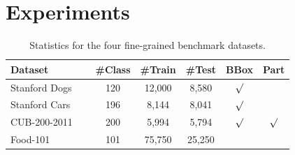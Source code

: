 \documentclass[10pt,twocolumn,letterpaper]{article}
\begin{document}



\section{Experiments}

\begin{table}[t]
\begin{center}
\addtolength{\tabcolsep}{2.5pt}
\begin{tabular}{l c c c c c}
\toprule[0.2 em]
Dataset & \#Class & \#Train & \#Test & BBox & Part \\
\toprule[0.2 em]
Stanford Dogs~\cite{khosla2011novel} \ & 120 & 12,000  &  8,580 & $\surd$ &    \\
Stanford Cars~\cite{krause20133d} \ & 196 & 8,144  & 8,041 & $\surd$ &  \\
CUB-200-2011~\cite{wah2011caltech} \ & 200 & 5,994 & 5,794 & $\surd$ & $\surd$ \\
Food-101~\cite{bossard2014food} \ & 101 & 75,750 & 25,250 & $ $ & $ $ \\
\bottomrule[0.1 em]
\end{tabular}
\vspace{1pt}
\caption{Statistics for the four fine-grained benchmark datasets.}
\label{tab:statistics}
\end{center}
\end{table}
\end{document}
